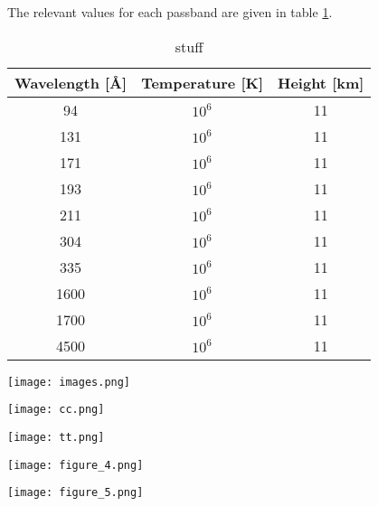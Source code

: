 \documentclass[preprint2]{aastex}
\begin{document}
The relevant values for each passband are given in table \ref{aia}.
\begin{table}[h]
\centering
    \begin{tabular}{c c c}
        \hline\hline
        Wavelength [\AA{}] & Temperature [K] & Height [km]\\
        \hline
        94 & $10^{6}$ & 11\\
        131 & $10^{6}$ & 11\\
        171 & $10^{6}$ & 11\\
        193 & $10^{6}$ & 11\\
        211 & $10^{6}$ & 11\\
        304 & $10^{6}$ & 11\\
        335 & $10^{6}$ & 11\\
        1600 & $10^{6}$ & 11\\
        1700 & $10^{6}$ & 11\\
        4500 & $10^{6}$ & 11\\
    \end{tabular}
\caption{stuff}
\label{aia}
\end{table}

\begin{figure*}[htb!]
    \texttt{[image: images.png]}
    \caption{Images of the BP in six different AIA wavelengths.}
\end{figure*}

\begin{figure*}[htb!]
    \texttt{[image: cc.png]}
    \caption{Cross-correlation}
\end{figure*}

\begin{figure*}[htb!]
    \texttt{[image: tt.png]}
    \caption{Timelag}
\end{figure*}

\begin{figure*}[htb!]
    \texttt{[image: figure\_4.png]}
    \caption{The highest cross-correlation value of each pixel is plotted against
        its distance from the center pixel. The color indicates the timelag at which
        the highest cross-correlation occurred.}
    \label{tau_all}
\end{figure*}

\begin{figure*}[htb!]
    \texttt{[image: figure\_5.png]}
    \caption{Same as figure \ref{tau_all}, but with two thirds of the timelag cut out.}
\end{figure*}
\end{document}
